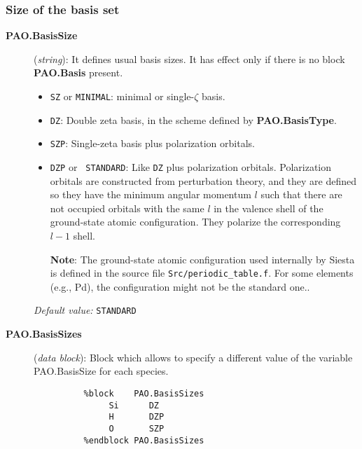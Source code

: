 \documentclass[11pt]{article}
\begin{document}
\subsubsection{Size of the basis set}
\begin{description}

\item[{\bf PAO.BasisSize}] ({\it string}): 
It defines usual basis sizes. It has effect only if there is no 
block {\bf PAO.Basis} present.

\begin{itemize}

\item {\tt SZ} or {\tt MINIMAL}: minimal or single-$\zeta$
basis.

\item {\tt DZ}: Double zeta basis, in the scheme
defined by {\bf PAO.BasisType}.

\item {\tt SZP}: Single-zeta basis plus polarization 
orbitals.

\item {\tt DZP} or {\tt
STANDARD}: Like {\tt DZ} plus
polarization orbitals.  Polarization orbitals are constructed from
perturbation theory, and they are
defined so they have the minimum angular
momentum $l$ such that there are not occupied orbitals with the same
$l$ in the valence shell of the ground-state atomic
configuration. They polarize the corresponding $l-1$ shell.

{\bf Note}: The ground-state atomic configuration used internally
by {\sc Siesta} is defined in the source file {\tt Src/periodic\_table.f}. 
For some elements (e.g., Pd), the configuration might not be the
standard one..

\end{itemize}

{\it Default value:} {\tt STANDARD}

\item[{\bf PAO.BasisSizes}]({\it data block}): 
Block which allows to specify a different value of the variable 
PAO.BasisSize for each species. 
\begin{verbatim}
          %block    PAO.BasisSizes
               Si      DZ
               H       DZP
               O       SZP 
          %endblock PAO.BasisSizes
\end{verbatim} 

\end{description}
\end{document}
